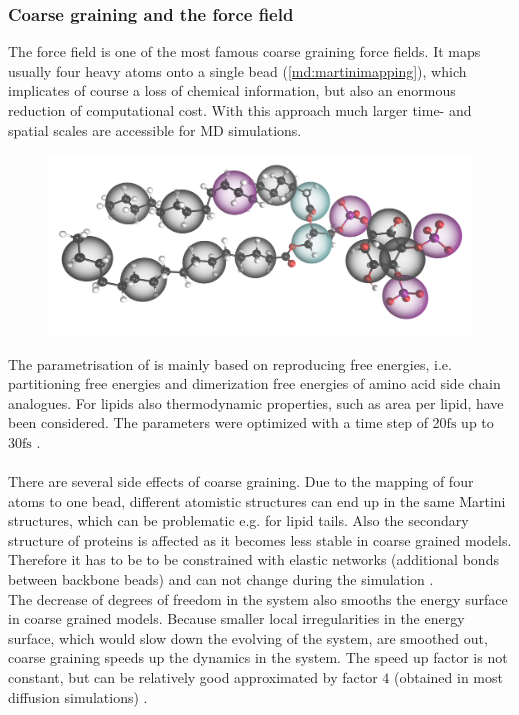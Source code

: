 \subsubsection{Coarse graining and the \martini{} force field}
\label{subsub:coarsegraining}
The \martini{} force field \autocites{martini}{martini22}{martini22_lipids} is one of the most famous coarse graining force fields. It maps usually four heavy atoms onto a single bead (\autoref{md:martinimapping}), which implicates of course a loss of chemical information, but also an enormous reduction of computational cost. With this approach much larger time- and spatial scales are accessible for MD simulations.\\
%
%
%
\begin{figure}
	\centering
	\includegraphics[width=.5\textwidth]{figures/introduction/fig_martini_mapping}
	\label{md:martinimapping}
\end{figure}
%
%
%
The parametrisation of \martini{} is mainly based on reproducing free energies, i.e. partitioning free energies and dimerization free energies of amino acid side chain analogues. For lipids also thermodynamic properties, such as area per lipid, have been considered. The parameters were optimized with a time step of 20$\si{\femto\second}$ up to 30$\si{\femto\second}$ \autocites{martini22}{martini22_lipids}.\\
\\
There are several side effects of coarse graining. Due to the mapping of four atoms to one bead, different atomistic structures can end up in the same Martini structures, which can be problematic e.g. for lipid tails. Also the secondary structure of proteins is affected as it becomes less stable in coarse grained models. Therefore it has to be to be constrained with elastic networks (additional bonds between backbone beads) and can not change during the simulation \autocite{martini22_check}.\\
The decrease of degrees of freedom in the system also smooths the energy surface in coarse grained models. Because smaller local irregularities in the energy surface, which would slow down the evolving of the system, are smoothed out, coarse graining speeds up the dynamics in the system. The speed up factor is not constant, but can be relatively good approximated by factor $4$ (obtained in most diffusion simulations) \autocites{martini22_check}{martini}.\\
